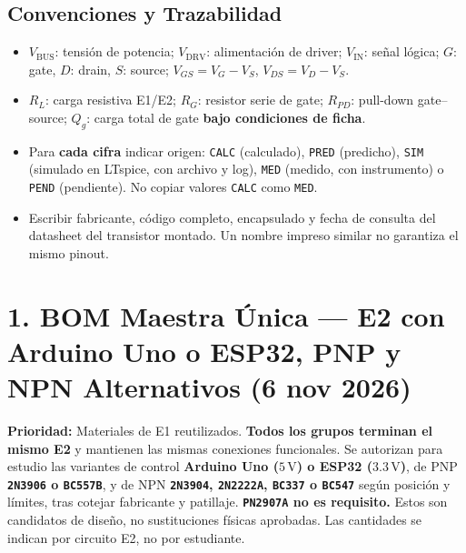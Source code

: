 \documentclass[10pt, a4paper, landscape]{article}
\begin{document}
\subsection*{Convenciones y Trazabilidad}
\begin{itemize}[noitemsep, topsep=2pt]
    \item $V_{\text{BUS}}$: tensión de potencia; $V_{\text{DRV}}$: alimentación de driver; $V_{\text{IN}}$: señal lógica; $G$: gate, $D$: drain, $S$: source; $V_{GS} = V_G - V_S$, $V_{DS} = V_D - V_S$.
    \item $R_L$: carga resistiva E1/E2; $R_G$: resistor serie de gate; $R_{PD}$: pull-down gate--source; $Q_g$: carga total de gate \textbf{bajo condiciones de ficha}.
    \item Para \textbf{cada cifra} indicar origen: \texttt{CALC} (calculado), \texttt{PRED} (predicho), \texttt{SIM} (simulado en LTspice, con archivo y log), \texttt{MED} (medido, con instrumento) o \texttt{PEND} (pendiente). No copiar valores \texttt{CALC} como \texttt{MED}.
    \item Escribir fabricante, código completo, encapsulado y fecha de consulta del datasheet del transistor montado. Un nombre impreso similar no garantiza el mismo pinout.
\end{itemize}

\newpage
\section*{1. BOM Maestra Única — E2 con Arduino Uno o ESP32, PNP y NPN Alternativos (6 nov 2026)}

\textbf{Prioridad:} Materiales de E1 reutilizados. \textbf{Todos los grupos terminan el mismo E2} y mantienen las mismas conexiones funcionales. Se autorizan para estudio las variantes de control \textbf{Arduino Uno ($5\,\text{V}$) o ESP32 ($3.3\,\text{V}$)}, de PNP \textbf{\texttt{2N3906} o \texttt{BC557B}}, y de NPN \textbf{\texttt{2N3904}, \texttt{2N2222A}, \texttt{BC337} o \texttt{BC547}} según posición y límites, tras cotejar fabricante y patillaje. \textbf{\texttt{PN2907A} no es requisito.} Estos son candidatos de diseño, no sustituciones físicas aprobadas. Las cantidades se indican por circuito E2, no por estudiante.
\end{document}
